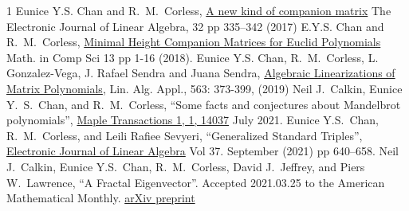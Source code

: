 \documentclass[a4paper]{amsart}
\newcommand{\RMC}{R.~M.~Corless}
\begin{document}
\begin{thebibliography}{1}
Eunice Y.S. Chan and \RMC,  \href{https://journals.uwyo.edu/index.php/ela/article/view/1781}{A new kind of companion matrix} The Electronic Journal of Linear Algebra,  32 pp 335--342 (2017)
E.Y.S. Chan and \RMC, \href{https://link.springer.com/article/10.1007/s11786-018-0364-2}{Minimal Height Companion Matrices for Euclid Polynomials} Math. in Comp Sci 13 pp 1-16 (2018).
Eunice Y.S. Chan, \RMC,  L. Gonzalez-Vega, J. Rafael Sendra and Juana Sendra, \href{ https://doi.org/10.1016/j.laa.2018.10.028}{Algebraic
Linearizations of Matrix Polynomials}, Lin. Alg. Appl., 563: 373-399, (2019)
 Neil J.~Calkin, Eunice Y.~S.~Chan, and \RMC, ``Some facts and conjectures about Mandelbrot polynomials'', \href{https://doi.org/10.5206/mt.v1i1.14037}{Maple Transactions 1, 1, 14037} July 2021.
Eunice Y.S.~Chan, \RMC, and Leili Rafiee Sevyeri, ``Generalized Standard Triples'', \href{https://doi.org/10.13001/ela.2021.4975}{Electronic Journal of Linear Algebra} Vol 37. September (2021) pp 640--658.
 Neil J.~Calkin, Eunice Y.S.~Chan, \RMC,  David J.~Jeffrey, and Piers W.~Lawrence, “A Fractal Eigenvector”.  Accepted 2021.03.25 to the American Mathematical Monthly. \href{https://arxiv.org/abs/2104.01116}{arXiv preprint}
\end{thebibliography}
\end{document}
